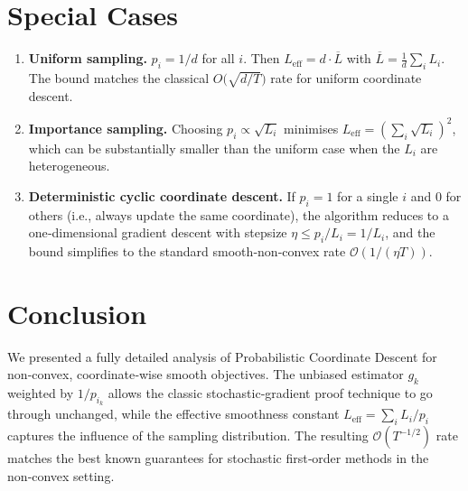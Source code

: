 \documentclass{article}
\begin{document}
\section*{Special Cases}
\begin{enumerate}
    \item \textbf{Uniform sampling.} $p_i=1/d$ for all $i$. Then $L_{\text{eff}} = d\cdot \overline{L}$ with $\overline{L} = \frac{1}{d}\sum_i L_i$. The bound matches the classical $O\bigl(\sqrt{d/T}\bigr)$ rate for uniform coordinate descent.
    \item \textbf{Importance sampling.} Choosing $p_i \propto \sqrt{L_i}$ minimises $L_{\text{eff}} = (\sum_i \sqrt{L_i})^2$, which can be substantially smaller than the uniform case when the $L_i$ are heterogeneous.
    \item \textbf{Deterministic cyclic coordinate descent.} If $p_i=1$ for a single $i$ and $0$ for others (i.e., always update the same coordinate), the algorithm reduces to a one‑dimensional gradient descent with stepsize $\eta\le p_i/L_i = 1/L_i$, and the bound simplifies to the standard smooth‑non‑convex rate $\mathcal{O}(1/(\eta T))$.
\end{enumerate}

\section*{Conclusion}
We presented a fully detailed analysis of Probabilistic Coordinate Descent for non‑convex, coordinate‑wise smooth objectives. The unbiased estimator $g_k$ weighted by $1/p_{i_k}$ allows the classic stochastic‑gradient proof technique to go through unchanged, while the effective smoothness constant $L_{\text{eff}}=\sum_i L_i/p_i$ captures the influence of the sampling distribution. The resulting $\mathcal{O}(T^{-1/2})$ rate matches the best known guarantees for stochastic first‑order methods in the non‑convex setting.
\end{document}
